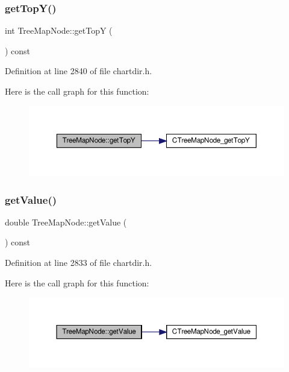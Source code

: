 \subsubsection{\texorpdfstring{get\+Top\+Y()}{getTopY()}}
{\footnotesize\ttfamily int Tree\+Map\+Node\+::get\+TopY (\begin{DoxyParamCaption}{ }\end{DoxyParamCaption}) const\hspace{0.3cm}{\ttfamily [inline]}}



Definition at line 2840 of file chartdir.\+h.

Here is the call graph for this function\+:
\nopagebreak
\begin{figure}[H]
\begin{center}
\leavevmode
\includegraphics[width=350pt]{class_tree_map_node_ad7fbaaab1bbaef5246ba977af6080add_cgraph}
\end{center}
\end{figure}
\mbox{\label{class_tree_map_node_a4ee3affd6ee258d92dbd562e2e474fe8}} 
\subsubsection{\texorpdfstring{get\+Value()}{getValue()}}
{\footnotesize\ttfamily double Tree\+Map\+Node\+::get\+Value (\begin{DoxyParamCaption}{ }\end{DoxyParamCaption}) const\hspace{0.3cm}{\ttfamily [inline]}}



Definition at line 2833 of file chartdir.\+h.

Here is the call graph for this function\+:
\nopagebreak
\begin{figure}[H]
\begin{center}
\leavevmode
\includegraphics[width=350pt]{class_tree_map_node_a4ee3affd6ee258d92dbd562e2e474fe8_cgraph}
\end{center}
\end{figure}
\mbox{\label{class_tree_map_node_ac9cda4e3299ca56a8f7e7cf0a90e23b0}} 
